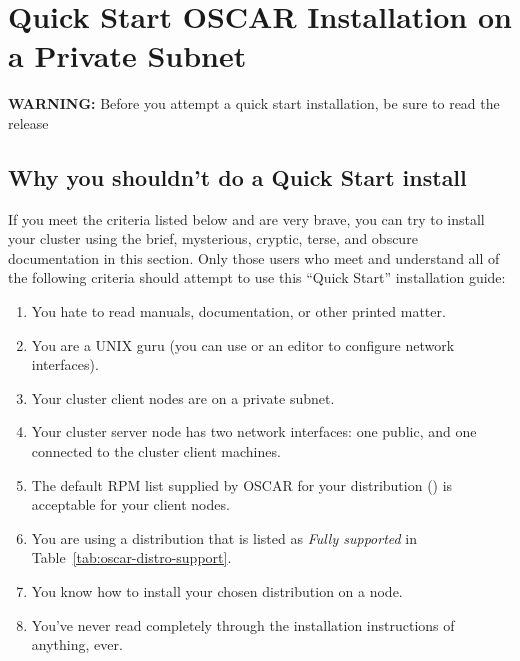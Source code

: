 %
%
%

\section{Quick Start OSCAR Installation on a Private Subnet}
\label{sec:quick-start}

{\bf WARNING:} Before you attempt a quick start installation, be sure
to read the release 


\subsection{Why you shouldn't do a Quick Start install}

If you meet the criteria listed below and are very brave, you can try
to install your cluster using the brief, mysterious, cryptic, terse,
and obscure documentation in this section.  Only those users who meet
and understand all of the following criteria should attempt to use
this ``Quick Start'' installation guide:

\begin{enumerate}
\item You hate to read manuals, documentation, or other printed
  matter.
\item You are a UNIX guru (you can use  or an editor to
  configure network interfaces).
\item Your cluster client nodes are on a private subnet.
\item Your cluster server node has two network interfaces: one public,
  and one connected to the cluster client machines.
\item The default RPM list supplied by OSCAR for your distribution
  ()
  is acceptable for your client nodes.
\item You are using a distribution that is listed as \emph{Fully
    supported} in Table~\ref{tab:oscar-distro-support}.
\item You know how to install your chosen distribution on a node.
\item You've never read completely through the installation
  instructions of anything, ever.
\end{enumerate}

